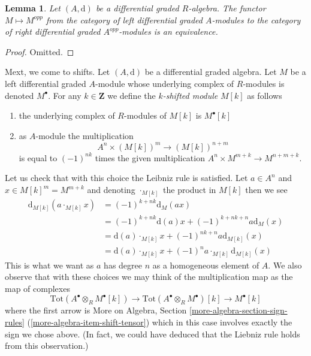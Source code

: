\documentclass{stacks-project}
\theoremstyle{plain}
\newtheorem{lemma}[subsection]{Lemma}
\theoremstyle{definition}
\theoremstyle{remark}
\numberwithin{equation}{subsection}
\begin{document}
\begin{lemma}
\label{lemma-left-right}
Let $(A, \text{d})$ be a differential graded $R$-algebra.
The functor $M \mapsto M^{opp}$ from the category of
left differential graded $A$-modules to the category of right
differential graded $A^{opp}$-modules is an equivalence.
\end{lemma}

\begin{proof}
Omitted.
\end{proof}

\noindent
Mext, we come to shifts. Let $(A, \text{d})$ be a differential graded algebra.
Let $M$ be a left differential graded $A$-module whose underlying complex
of $R$-modules is denoted $M^\bullet$.
For any $k \in \mathbf{Z}$ we define the {\it $k$-shifted module}
$M[k]$ as follows
\begin{enumerate}
\item the underlying complex of $R$-modules of $M[k]$ is $M^\bullet[k]$
\item as $A$-module the multiplication
$$
A^n \times (M[k])^m \longrightarrow (M[k])^{n + m}
$$
is equal to $(-1)^{nk}$ times the given multiplication
$A^n \times M^{m + k} \to M^{n + m + k}$.
\end{enumerate}
Let us check that with this choice the Leibniz rule is satisfied.
Let $a \in A^n$ and $x \in M[k]^m = M^{m + k}$ and denoting
$\cdot_{M[k]}$ the product in $M[k]$ then we see
\begin{align*}
\text{d}_{M[k]}(a \cdot_{M[k]} x)
& =
(-1)^{k + nk} \text{d}_M(ax) \\
& =
(-1)^{k + nk} \text{d}(a) x + (-1)^{k + nk + n} a \text{d}_M(x) \\
& =
\text{d}(a) \cdot_{M[k]} x + (-1)^{nk + n} a \text{d}_{M[k]}(x) \\
& =
\text{d}(a) \cdot_{M[k]} x + (-1)^n a \cdot_{M[k]} \text{d}_{M[k]}(x)
\end{align*}
This is what we want as $a$ has degree $n$ as a homogeneous element of $A$.
We also observe that with these choices we may think of
the multiplication map as the map of complexes
$$
\text{Tot}(A^\bullet \otimes_R M^\bullet[k]) \to
\text{Tot}(A^\bullet \otimes_R M^\bullet)[k] \to
M^\bullet[k]
$$
where the first arrow is
More on Algebra, Section \ref{more-algebra-section-sign-rules}
(\ref{more-algebra-item-shift-tensor}) which in this
case involves exactly the sign we chose above. (In fact, we could have deduced
that the Liebniz rule holds from this observation.)
\end{document}
